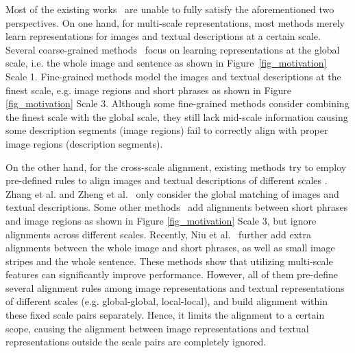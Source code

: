 \documentclass[final]{cvpr}
\begin{document}
Most of the existing works~\cite{wang2020vitaa,jing2020pose,niu2020improving}
are unable to fully satisfy the aforementioned two perspectives. 
On one hand, for multi-scale representations, most methods merely learn representations for images and textual descriptions at a certain scale. Several coarse-grained methods~\cite{li2017person,li2017identity,chen2018improving,zhang2018deep,zheng2020dual} focus on learning representations at the global scale, i.e. the whole image and sentence as shown in Figure~\ref{fig_motivation} Scale 1. Fine-grained methods \cite{wang2020vitaa,jing2020pose,niu2020improving} model the images and textual descriptions at the finest scale, e.g. image regions and short phrases as shown in Figure \ref{fig_motivation} Scale 3. 
Although some fine-grained methods \cite{jing2020pose,niu2020improving} consider combining the finest scale with the global scale, they still 
lack mid-scale information causing some description segments (image regions) fail to correctly align with proper image regions (description segments). 

On the other hand, for the cross-scale alignment, existing methods \cite{zhang2018deep,zheng2020dual,wang2020vitaa,jing2020pose,niu2020improving} try to employ pre-defined rules to align images and textual descriptions of different scales . Zhang et al. and Zheng et al.~\cite{zhang2018deep,zheng2020dual} only consider the global matching of images and textual descriptions. Some other methods~\cite{wang2020vitaa,jing2020pose} add alignments between 
short phrases and image regions as shown in Figure \ref{fig_motivation} Scale 3, but ignore alignments across different scales. Recently, Niu et al.~\cite{niu2020improving} further add extra alignments between the whole image and short phrases, as well as small image stripes and the whole sentence. These methods show that utilizing multi-scale features can significantly improve performance. However, all of them pre-define several 
alignment rules among image representations and textual representations of different scales (e.g. global-global, local-local), and build alignment within these fixed scale pairs separately. 
Hence, it limits the alignment to a certain scope, causing the alignment between image representations and textual representations outside the scale pairs are completely ignored. 
\end{document}
